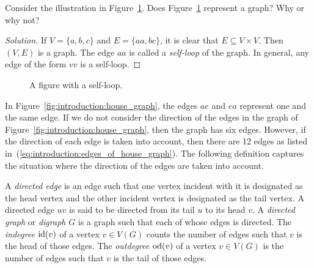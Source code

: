 \begin{example}
Consider the illustration in
Figure~\ref{fig:introduction:self_loop}. Does
Figure~\ref{fig:introduction:self_loop} represent a graph? Why or why not?
\end{example}

\begin{proof}[Solution]
If $V = \{ a, b, c \}$ and $E = \{ aa, bc \}$, it is clear that $E
\subseteq V \times V$. Then $(V, E)$ is a graph. The edge $aa$ is
called a \emph{self-loop} of the graph. In general, any edge of the
form $vv$ is a self-loop.
\end{proof}

\begin{figure}[!htbp]
\centering
{}
\caption{A figure with a self-loop.}
\label{fig:introduction:self_loop}
\end{figure}

In Figure~\ref{fig:introduction:house_graph}, the edges $ae$ and $ea$
represent one and the same edge. If we do not consider the direction
of the edges in the graph of
Figure~\ref{fig:introduction:house_graph}, then the graph has six
edges. However, if the direction of each edge is taken into account,
then there are 12 edges as listed
in~(\ref{eq:introduction:edges_of_house_graph}). The following
definition captures the situation where the direction of the edges are
taken into account.

A \emph{directed edge} is an edge such that one vertex incident with it
is designated as the head vertex and the other incident vertex is
designated as the tail vertex. A directed edge $uv$ is said to be
directed from its tail $u$ to its head $v$. A \emph{directed graph} or
\emph{digraph} $G$ is a graph such that each of whose edges is
directed. The \emph{indegree} $\operatorname*{id}(v)$ of a vertex $v \in V(G)$ counts
the number of edges such that $v$ is the head of those edges. The
\emph{outdegree} $\operatorname*{od}(v)$ of a vertex $v \in V(G)$ is the number of
edges such that $v$ is the tail of those edges.
\index{$\id$}
\index{$\od$}

